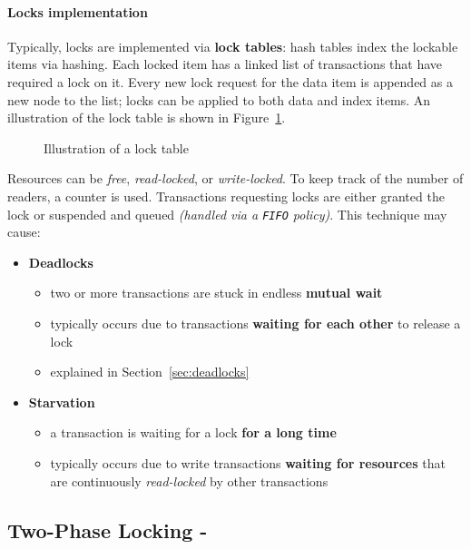\documentclass[english]{article}
\begin{document}
\paragraph{Locks implementation}

Typically, locks are implemented via \textbf{lock tables}: hash tables index the lockable items via hashing.
Each locked item has a linked list of transactions that have required a lock on it.
Every new lock request for the data item is appended as a new node to the list;
locks can be applied to both data and index items.
An illustration of the lock table is shown in Figure~\ref{fig:lock-table}.

\begin{figure}[htbp]
  \centering
  \bigskip
  \caption{Illustration of a lock table}
  \label{fig:lock-table}
  \bigskip
\end{figure}

Resources can be \textit{free}, \textit{read-locked}, or \textit{write-locked}.
To keep track of the number of readers, a counter is used.
Transactions requesting locks are either granted the lock or suspended and queued \textit{(handled via a \texttt{FIFO} policy)}.
This technique may cause:

\begin{itemize}
  \item \textbf{Deadlocks}
        \begin{itemize}
          \item two or more transactions are stuck in endless \textbf{mutual wait}
          \item typically occurs due to transactions \textbf{waiting for each other} to release a lock
          \item explained in Section~\ref{sec:deadlocks}
        \end{itemize}
  \item \textbf{Starvation}
        \begin{itemize}
          \item a transaction is waiting for a lock \textbf{for a long time}
          \item typically occurs due to write transactions \textbf{waiting for resources} that are continuously \textit{read-locked} by other transactions
        \end{itemize}
\end{itemize}

\subsection{Two-Phase Locking - \tpl}
\end{document}
